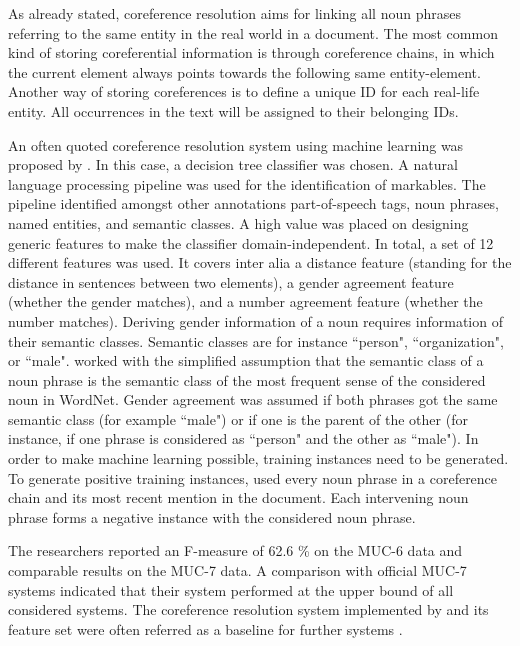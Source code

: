 As already stated, coreference resolution aims for linking all noun phrases referring to the same entity in the real world in a document. The most common kind of storing coreferential information is through coreference chains, in which the current element always points towards the following same entity-element. Another way of storing coreferences is to define a unique ID for each real-life entity. All occurrences in the text will be assigned to their belonging IDs.

An often quoted coreference resolution system using machine learning was proposed by \cite{soon2001machine}. In this case, a decision tree classifier was chosen. A natural language processing pipeline was used for the identification of markables. The pipeline identified amongst other annotations part-of-speech tags, noun phrases, named entities, and semantic classes. A high value was placed on designing generic features to make the classifier domain-independent. In total, a set of 12 different features was used. It covers inter alia a distance feature (standing for the distance in sentences between two elements), a gender agreement feature (whether the gender matches), and a number agreement feature (whether the number matches). Deriving gender information of a noun requires information of their semantic classes. Semantic classes are for instance ``person", ``organization", or ``male". \cite{soon2001machine} worked with the simplified assumption that the semantic class of a noun phrase is the semantic class of the most frequent sense of the considered noun in WordNet. Gender agreement was assumed if both phrases got the same semantic class (for example ``male") or if one is the parent of the other (for instance, if one phrase is considered as ``person" and the other as ``male"). 
In order to make machine learning possible, training instances need to be generated.\\
To generate positive training instances, \cite{soon2001machine} used every noun phrase in a coreference chain and its most recent mention in the document. Each intervening noun phrase forms a negative instance with the considered noun phrase. 

The researchers reported an F-measure of 62.6 \% on the MUC-6 data and comparable results on the MUC-7 data. A comparison with official MUC-7 systems indicated that their system performed at the upper bound of all considered systems. The coreference resolution system implemented by \cite{soon2001machine} and its feature set were often referred as a baseline for further systems \citep{versley2008bart}.

